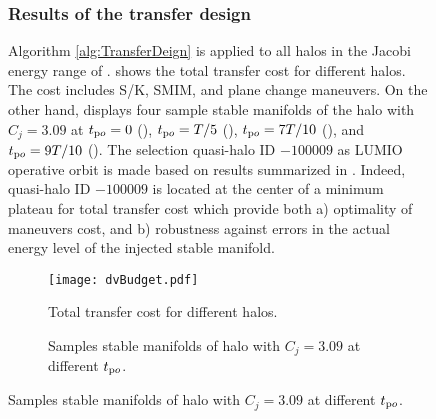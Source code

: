 \begin{figure*}[b!]
\subsubsection{Results of the transfer design }\label{subsubsec:TransferDesignResults}
Algorithm \ref{alg:TransferDeign} is applied to all halos in the Jacobi energy range of .  shows the total transfer cost for different halos. The cost includes S/K, SMIM, and plane change maneuvers. On the other hand,  displays four sample stable manifolds of the halo with $C_j = 3.09$ at $t_{\textrm po}=0$ (), $t_{\textrm po}=T/5$ (), $t_{\textrm po}=7T/10$ (), and $t_{\textrm po}=9T/10$ (). The selection quasi-halo ID $-100009$ as LUMIO operative orbit is made based on results summarized in . Indeed, quasi-halo ID $-100009$ is located at the center of a minimum plateau for total transfer cost which provide both a) optimality of maneuvers cost, and b) robustness against errors in the actual energy level of the injected stable manifold.
%
\begin{figure}[b!]
	\centering
	\texttt{[image: dvBudget.pdf]}
	\caption{Total transfer cost for different halos.}
	\label{fig:TotalTransferCost}
\end{figure}
%
%
\begin{figure}[]
	\centering
	\hfill
	\hfill
	\hfill
	\hfill
	\hfill
	\caption[Stable manifolds of operative halo]{Samples stable manifolds of halo with $C_j = 3.09$ at different $t_{\textrm po}$.}
	\label{fig:Halo9SampleStableManifold}
\end{figure}
%


\end{figure*}
